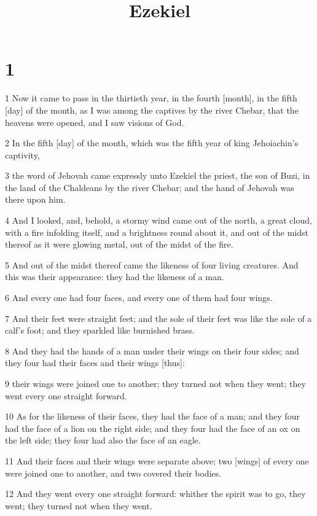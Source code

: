 

\title{Ezekiel}

\chapter{1}

\par 1 Now it came to pass in the thirtieth year, in the fourth [month], in the fifth [day] of the month, as I was among the captives by the river Chebar, that the heavens were opened, and I saw visions of God.
\par 2 In the fifth [day] of the month, which was the fifth year of king Jehoiachin's captivity,
\par 3 the word of Jehovah came expressly unto Ezekiel the priest, the son of Buzi, in the land of the Chaldeans by the river Chebar; and the hand of Jehovah was there upon him.
\par 4 And I looked, and, behold, a stormy wind came out of the north, a great cloud, with a fire infolding itself, and a brightness round about it, and out of the midst thereof as it were glowing metal, out of the midst of the fire.
\par 5 And out of the midst thereof came the likeness of four living creatures. And this was their appearance: they had the likeness of a man.
\par 6 And every one had four faces, and every one of them had four wings.
\par 7 And their feet were straight feet; and the sole of their feet was like the sole of a calf's foot; and they sparkled like burnished brass.
\par 8 And they had the hands of a man under their wings on their four sides; and they four had their faces and their wings [thus]:
\par 9 their wings were joined one to another; they turned not when they went; they went every one straight forward.
\par 10 As for the likeness of their faces, they had the face of a man; and they four had the face of a lion on the right side; and they four had the face of an ox on the left side; they four had also the face of an eagle.
\par 11 And their faces and their wings were separate above; two [wings] of every one were joined one to another, and two covered their bodies.
\par 12 And they went every one straight forward: whither the spirit was to go, they went; they turned not when they went.
